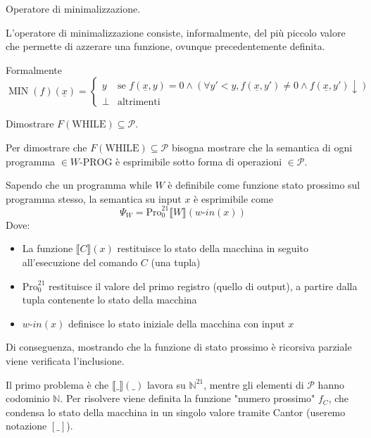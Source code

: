 \documentclass[12pt, answers]{exam}
\theoremstyle{plain}
\DeclareMathOperator{\MIN}{MIN}
\newcommand{\while}{\text{WHILE}}
\newcommand{\wprog}{W\text{-PROG}}
\newcommand{\cp}{\mathcal{P}}
\newcommand{\N}{\mathbb{N}}
\newcommand{\pro}{\text{Pro}}
\newcommand{\win}{w\text{-}in}
\begin{document}
\begin{questions}
        \question Operatore di minimalizzazione.
        
        \begin{solution}
            L'operatore di minimalizzazione consiste, informalmente, del più piccolo valore che permette di azzerare una funzione, ovunque precedentemente definita. 
            
            Formalmente
            $$ \MIN (f) (\underline{x}) = \begin{cases}
                y & \text{se } f(\underline{x}, y) = 0 \wedge (\forall y' < y, f(\underline{x}, y') \neq 0 \wedge f(\underline{x}, y') \downarrow) \\
                \bot & \text{altrimenti}
            \end{cases}$$
        \end{solution}
        
        \question Dimostrare $F(\while) \subseteq \cp$.
        
        \begin{solution}
            Per dimostrare che $F (\while) \subseteq \cp$ bisogna mostrare che la semantica di ogni programma $\in \wprog$ è esprimibile sotto forma di operazioni $\in \cp$. 
            
            Sapendo che un programma while  $W$ è definibile come funzione stato prossimo sul programma stesso, la semantica su input $x$ è esprimibile come
            $$ \Psi_W = \pro_0^{21} \llbracket W \rrbracket (\win (x)) $$
            Dove: 
            \begin{itemize}
                \item La funzione $\llbracket C \rrbracket (x)$ restituisce lo stato della macchina in seguito all'esecuzione del comando $C$ (una tupla)
                
                \item $\pro_0^{21}$ restituisce il valore del primo registro (quello di output), a partire dalla tupla contenente lo stato della macchina
                
                \item $\win(x)$ definisce lo stato iniziale della macchina con input $x$
            \end{itemize}
            
            Di conseguenza, mostrando che la funzione di stato prossimo è ricorsiva parziale viene verificata l'inclusione. 
            
            Il primo problema è che $\llbracket \_ \rrbracket (\_)$ lavora su $\N^{21}$, mentre gli elementi di $\cp$ hanno codominio $\N$. Per risolvere viene definita la funzione "numero prossimo" $f_C$, che condensa lo stato della macchina in un singolo valore tramite Cantor (useremo notazione $\left[\_\right]$).
            

\end{solution}
\end{questions}
\end{document}
